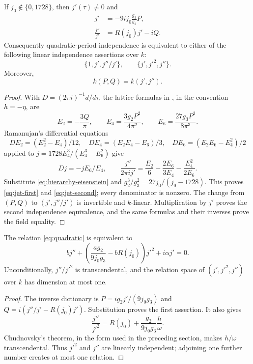 \begin{proposition}\label{prop:period-jets}
If $j_0\notin\{0,1728\}$, then $j'(\tau)\ne0$ and
\begin{align}
 j'&=-9ij_0\frac{g_3}{g_2}P,\label{eq:jet-first}\\
 \frac{j''}{j'}&=R(j_0)j'-iQ.\label{eq:jet-second}
\end{align}
Consequently quadratic-period independence is equivalent to either
of the following linear independence assertions over $k$:
\[
 \{1,j',j''/j'\},\qquad \{j',j'^2,j''\}.
\]
Moreover,
\begin{equation}\label{eq:hierarchy-jets-field}
 k(P,Q)=k(j',j'').
\end{equation}
\end{proposition}
\begin{proof}
With $D=(2\pi i)^{-1}d/d\tau$, the lattice formulas in
\cite[Proposition~4.7]{Fonseca}, in the convention $h=-\eta$, are
\begin{equation}\label{eq:hierarchy-eisenstein}
 E_2=-\frac{3Q}{\pi},\qquad
 E_4=\frac{3g_2P^2}{4\pi^2},\qquad
 E_6=\frac{27g_3P^3}{8\pi^3}.
\end{equation}
Ramanujan's differential equations
\[
 DE_2=(E_2^2-E_4)/12,\quad
 DE_4=(E_2E_4-E_6)/3,\quad
 DE_6=(E_2E_6-E_4^2)/2
\]
applied to $j=1728E_4^3/(E_4^3-E_6^2)$ give
\[
 Dj=-jE_6/E_4,\qquad
 \frac{j''}{2\pi i j'}=\frac{E_2}{6}
       -\frac{2E_6}{3E_4}-\frac{E_4^2}{2E_6}.
\]
Substitute \eqref{eq:hierarchy-eisenstein} and
$g_2^3/g_3^2=27j_0/(j_0-1728)$.  This proves
\eqref{eq:jet-first} and \eqref{eq:jet-second}; every denominator is nonzero.  The change from
$(P,Q)$ to $(j',j''/j')$ is invertible and $k$-linear.  Multiplication
by $j'$ proves the second independence equivalence, and the same
formulas and their inverses prove the field equality.
\end{proof}

\begin{corollary}\label{cor:forbidden-jet}
The relation \eqref{eq:quadratic} is equivalent to
\begin{equation}\label{eq:forbidden-jet}
 b j''+\left(\frac{ag_2}{9j_0g_3}-bR(j_0)\right)j'^2
                  +i\alpha j'=0.
\end{equation}
Unconditionally, $j''/j'^2$ is transcendental, and the relation space
of $(j',j'^2,j'')$ over $k$ has dimension at most one.
\end{corollary}
\begin{proof}
The inverse dictionary is
$P=ig_2j'/(9j_0g_3)$ and
$Q=i(j''/j'-R(j_0)j')$.  Substitution proves the first assertion.
It also gives
\[
 \frac{j''}{j'^2}=R(j_0)+\frac{g_2}{9j_0g_3}\frac h\omega.
\]
Chudnovsky's theorem, in the form used in the preceding section,
makes $h/\omega$ transcendental.  Thus $j'^2$ and $j''$ are linearly
independent; adjoining one further number creates at most one relation.
\end{proof}

